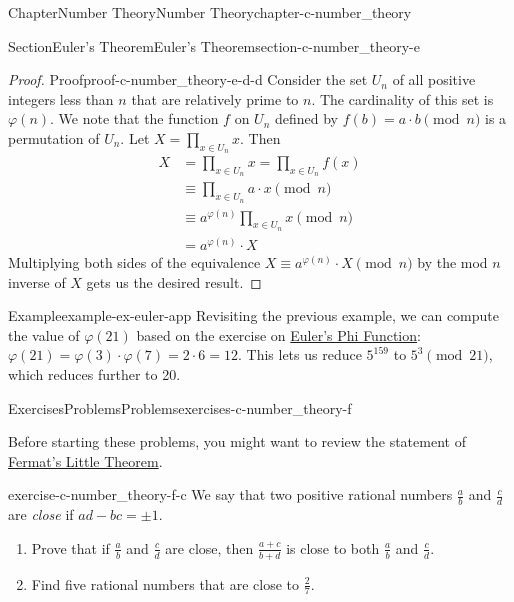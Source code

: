 \documentclass[oneside,10pt,]{book}
\numberwithin{equation}{section}
\begin{document}
\begin{chapterptx}{Chapter}{Number Theory}{}{Number Theory}{}{}{chapter-c-number_theory}
\begin{sectionptx}{Section}{Euler's Theorem}{}{Euler's Theorem}{}{}{section-c-number_theory-e}
\begin{proof}{Proof}{}{proof-c-number_theory-e-d-d}
Consider the set \(U_n\) of all positive integers less than \(n\) that are relatively prime to \(n\). The cardinality of this set is \(\varphi(n)\).  We note that the function \(f\) on \(U_n\) defined by \(f(b) = a \cdot b \pmod{n}\) is a permutation of \(U_n\). Let \(X=\prod_{x \in U_n} x\). Then%
\begin{equation*}
\begin{split}
X  &= \prod_{x \in U_n} x =  \prod_{x \in U_n} f(x) \\
&\equiv  \prod_{x \in U_n} a\cdot x \pmod{n} \\
&\equiv  a^{\varphi(n)} \prod_{x \in U_n}  x \pmod{n} \\
& = a^{\varphi(n)} \cdot X
\end{split}
\end{equation*}
Multiplying both sides of the equivalence \(X \equiv a^{\varphi(n)} \cdot X \pmod{n}\) by the mod \(n\) inverse of \(X\) gets us the desired result.%
\end{proof}
\begin{example}{Example}{}{example-ex-euler-app}%
Revisiting the previous example, we can compute the value of \(\varphi(21)\) based on the exercise on \hyperlink{exercise-exercise-euler-phi}{Euler's Phi Function}:  \(\varphi(21)=\varphi(3)\cdot\varphi(7)=2 \cdot 6 = 12\).  This lets us reduce \(5^{159}\) to \(5^{3} \pmod{21}\), which reduces further to 20.%
\end{example}
\end{sectionptx}
%
%
\typeout{************************************************}
\typeout{************************************************}
%
\begin{exercises-section}{Exercises}{Problems}{}{Problems}{}{}{exercises-c-number_theory-f}
\begin{introduction}{}%
Before starting these problems, you might want to review the statement of \hyperref[theorem-theorem-fermat-little]{Fermat's Little Theorem}.%
\end{introduction}%
\begin{divisionexercise}{1}{}{}{exercise-c-number_theory-f-c}%
We say that two positive rational numbers \(\frac{a}{b}\) and \(\frac{c}{d}\) are \emph{close} if \(a d - b c = \pm 1\).%
\begin{enumerate}[label=(\alph*)]
\item{}Prove that if \(\frac{a}{b}\) and \(\frac{c}{d}\) are close, then \(\frac{a+c}{b+d}\) is close to both \(\frac{a}{b}\) and \(\frac{c}{d}\).%
\item{}Find five rational numbers that are close to \(\frac{2}{7}\).%

\end{enumerate}
\end{divisionexercise}
\end{exercises-section}
\end{chapterptx}
\end{document}
